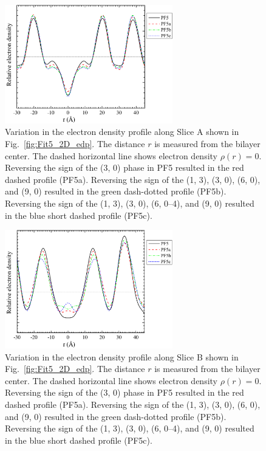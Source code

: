 \begin{figure}[htbp]
  \centering
  \includegraphics[width=0.65\textwidth]{figures/ripple/LAXS/major_phase_variation}
  \caption[Variation in the electron density profile along Slice A shown in 
  Fig.~\ref{fig:Fit5_2D_edp}]
  {Variation in the electron density profile along Slice A shown in 
  Fig.~\ref{fig:Fit5_2D_edp}.
  The distance $r$ is measured from the bilayer center.
  The dashed horizontal line shows electron density $\rho(r)=0$.
  Reversing the sign of the (3, 0) phase in PF5 
  resulted in the red dashed profile (PF5a). Reversing the sign of the 
  (1, 3), (3, 0), (6, 0), and (9, 0) resulted in the green dash-dotted profile
  (PF5b). Reversing the sign of the (1, 3), (3, 0), (6, 0--4), and (9, 0)
  resulted in the blue short dashed profile (PF5c).}
  \label{fig:major_phase_variation}
\end{figure}

\begin{figure}[htbp]
  \centering
  \includegraphics[width=0.65\textwidth]{figures/ripple/LAXS/minor_phase_variation}
  \caption[Variation in the electron density profile along Slice B shown in 
  Fig.~\ref{fig:Fit5_2D_edp}]
  {Variation in the electron density profile along Slice B shown in 
  Fig.~\ref{fig:Fit5_2D_edp}.
  The distance $r$ is measured from the bilayer center.
  The dashed horizontal line shows electron density $\rho(r)=0$.
  Reversing the sign of the (3, 0) phase in PF5 
  resulted in the red dashed profile (PF5a). Reversing the sign of the 
  (1, 3), (3, 0), (6, 0), and (9, 0) resulted in the green dash-dotted profile
  (PF5b). Reversing the sign of the (1, 3), (3, 0), (6, 0--4), and (9, 0)
  resulted in the blue short dashed profile (PF5c).}
  \label{fig:minor_phase_variation}
\end{figure}

